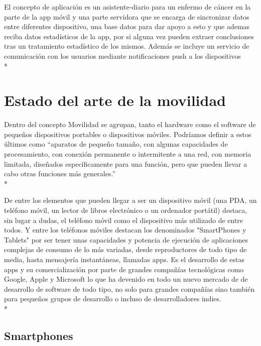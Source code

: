 \documentclass[../pfc.tex]{subfiles}
\begin{document}
	
	El concepto de aplicación es un asistente-diario para un enfermo de cáncer en la parte de la app móvil y una parte servidora que se encarga de sincronizar datos entre diferentes dispositivo, una base datos para dar apoyo a esto y que ademas reciba datos estadísticos de la app, por si alguna vez pueden extraer conclusiones tras un tratamiento estadístico de los mismos. Además se incluye un servicio de comunicación con los usuarios mediante notificaciones push a los dispositivos\\*
	
	
	\section{Estado del arte de la movilidad}
	Dentro del concepto Movilidad se agrupan, tanto el hardware como el software de pequeños dispositivos portables o dispositivos móviles. Podríamos definir a estos últimos como “aparatos de pequeño tamaño, con algunas capacidades de procesamiento, con conexión permanente o intermitente a una red, con memoria limitada, diseñados específicamente para una función, pero que pueden llevar a cabo otras funciones más generales.”\\*
	
	De entre los elementos que pueden llegar a ser un dispositivo móvil (una PDA, un teléfono móvil, un lector de libros electrónico o un ordenador portátil) destaca, sin lugar a dudas, el teléfono móvil como el dispositivo más utilizado de entre todos. Y entre los teléfonos móviles destacan los denominados "SmartPhones y Tablets" por ser tener unas capacidades y potencia de ejecución de aplicaciones complejas de consumo de lo más variadas, desde reproductores de todo tipo de media, hasta mensajería instantáneas, llamadas apps. Es el desarrollo de estas apps y su comercialización por parte de grandes compañías tecnológicas como Google, Apple y Microsoft lo que ha devenido en todo un nuevo mercado de de desarrollo de software de todo tipo, no solo para grandes compañías sino también para pequeños grupos de desarrollo o incluso de desarrolladores indies. \\*
	
	\subsection{Smartphones}
	
\end{document}
